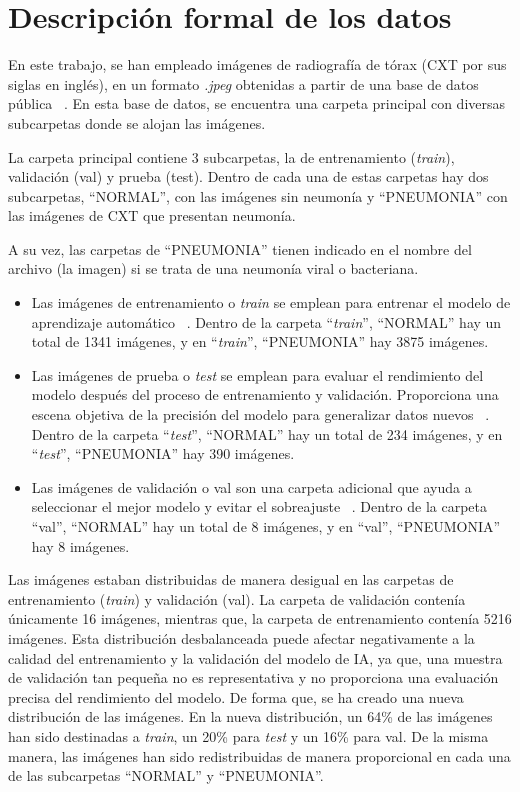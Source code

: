 

\section{Descripción formal de los datos}

En este trabajo, se han empleado imágenes de radiografía de tórax (CXT por sus siglas en inglés), en un formato \textit{.jpeg} obtenidas a partir de una base de datos pública ~\cite{kaggle24}. En esta base de datos, se encuentra una carpeta principal con diversas subcarpetas donde se alojan las imágenes.

La carpeta principal contiene 3 subcarpetas, la de entrenamiento (\textit{train}), validación (val) y prueba (test). Dentro de cada una de estas carpetas hay dos subcarpetas, ``NORMAL'', con las imágenes sin neumonía y ``PNEUMONIA'' con las imágenes de CXT que presentan neumonía.

A su vez, las carpetas de ``PNEUMONIA'' tienen indicado en el nombre del archivo (la imagen) si se trata de una neumonía viral o bacteriana. 

\begin{itemize}
    \item Las imágenes de entrenamiento o \textit{train} se emplean para entrenar el modelo de aprendizaje automático ~\cite{linkdif24}. Dentro de la carpeta ``\textit{train}'', ``NORMAL'' hay un total de 1341 imágenes, y en ``\textit{train}'', ``PNEUMONIA'' hay 3875 imágenes.
    \item Las imágenes de prueba o \textit{test} se emplean para evaluar el rendimiento del modelo después del proceso de entrenamiento y validación. Proporciona una escena objetiva de la precisión del modelo para generalizar datos nuevos ~\cite{linkdif24}. Dentro de la carpeta ``\textit{test}'', ``NORMAL'' hay un total de 234 imágenes, y en ``\textit{test}'', ``PNEUMONIA'' hay 390 imágenes.
    \item Las imágenes de validación o val son una carpeta adicional que ayuda a seleccionar el mejor modelo y evitar el sobreajuste ~\cite{linkdif24}. Dentro de la carpeta ``val'', ``NORMAL'' hay un total de 8 imágenes, y en ``val'', ``PNEUMONIA'' hay 8 imágenes.
\end{itemize}

Las imágenes estaban distribuidas de manera desigual en las carpetas de entrenamiento (\textit{train}) y validación (val). La carpeta de validación contenía únicamente 16 imágenes, mientras que, la carpeta de entrenamiento contenía 5216 imágenes. Esta distribución desbalanceada puede afectar negativamente a la calidad del entrenamiento y la validación del modelo de IA, ya que, una muestra de validación tan pequeña no es representativa y no proporciona una evaluación precisa del rendimiento del modelo. De forma que, se ha creado una nueva distribución de las imágenes.
En la nueva distribución, un 64\% de las imágenes han sido destinadas a \textit{train}, un 20\% para \textit{test} y un 16\% para val. De la misma manera, las imágenes han sido redistribuidas de manera proporcional en cada una de las subcarpetas ``NORMAL'' y ``PNEUMONIA''.

